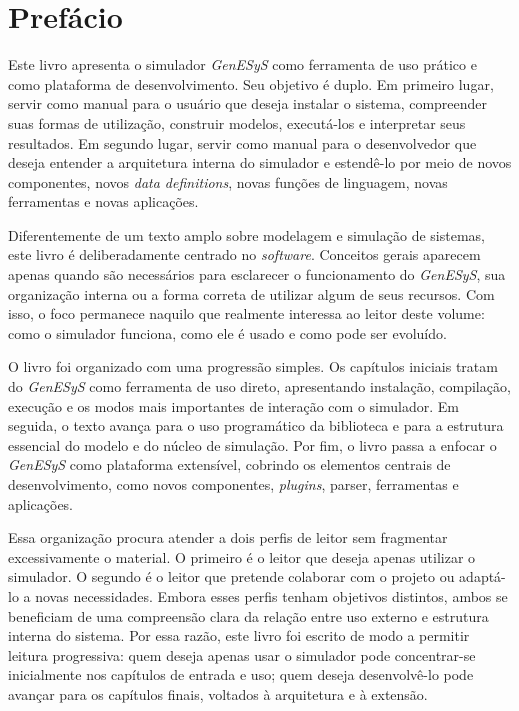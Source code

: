 \chapter*{Prefácio}

Este livro apresenta o simulador \textit{GenESyS} como ferramenta de uso prático e como plataforma de desenvolvimento. Seu objetivo é duplo. Em primeiro lugar, servir como manual para o usuário que deseja instalar o sistema, compreender suas formas de utilização, construir modelos, executá-los e interpretar seus resultados. Em segundo lugar, servir como manual para o desenvolvedor que deseja entender a arquitetura interna do simulador e estendê-lo por meio de novos componentes, novos \textit{data definitions}, novas funções de linguagem, novas ferramentas e novas aplicações.

Diferentemente de um texto amplo sobre modelagem e simulação de sistemas, este livro é deliberadamente centrado no \textit{software}. Conceitos gerais aparecem apenas quando são necessários para esclarecer o funcionamento do \textit{GenESyS}, sua organização interna ou a forma correta de utilizar algum de seus recursos. Com isso, o foco permanece naquilo que realmente interessa ao leitor deste volume: como o simulador funciona, como ele é usado e como pode ser evoluído.

O livro foi organizado com uma progressão simples. Os capítulos iniciais tratam do \textit{GenESyS} como ferramenta de uso direto, apresentando instalação, compilação, execução e os modos mais importantes de interação com o simulador. Em seguida, o texto avança para o uso programático da biblioteca e para a estrutura essencial do modelo e do núcleo de simulação. Por fim, o livro passa a enfocar o \textit{GenESyS} como plataforma extensível, cobrindo os elementos centrais de desenvolvimento, como novos componentes, \textit{plugins}, parser, ferramentas e aplicações.

Essa organização procura atender a dois perfis de leitor sem fragmentar excessivamente o material. O primeiro é o leitor que deseja apenas utilizar o simulador. O segundo é o leitor que pretende colaborar com o projeto ou adaptá-lo a novas necessidades. Embora esses perfis tenham objetivos distintos, ambos se beneficiam de uma compreensão clara da relação entre uso externo e estrutura interna do sistema. Por essa razão, este livro foi escrito de modo a permitir leitura progressiva: quem deseja apenas usar o simulador pode concentrar-se inicialmente nos capítulos de entrada e uso; quem deseja desenvolvê-lo pode avançar para os capítulos finais, voltados à arquitetura e à extensão.

